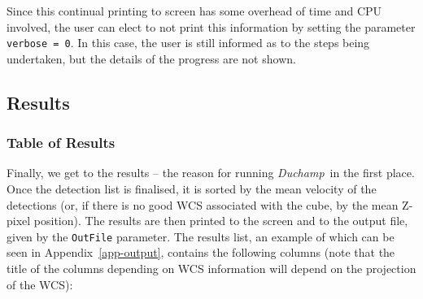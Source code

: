 \documentclass[12pt,a4paper]{article}
\newcommand{\duchamp}{\emph{Duchamp}}
\begin{document}
Since this continual printing to screen has some overhead of time and
CPU involved, the user can elect to not print this information by
setting the parameter \texttt{verbose = 0}. In this case, the user is
still informed as to the steps being undertaken, but the details of
the progress are not shown.

\subsection{Results}

\subsubsection{Table of Results}

Finally, we get to the results -- the reason for running \duchamp\ in
the first place. Once the detection list is finalised, it is sorted by
the mean velocity of the detections (or, if there is no good WCS
associated with the cube, by the mean Z-pixel position). The results
are then printed to the screen and to the output file, given by the
\texttt{OutFile} parameter. The results list, an example of which can be
seen in Appendix~\ref{app-output}, contains the following columns
(note that the title of the columns depending on WCS information will
depend on the projection of the WCS):
\end{document}
